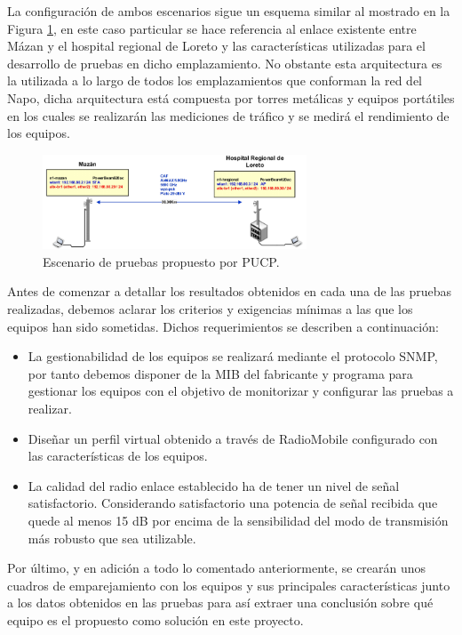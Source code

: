  La configuración de ambos escenarios sigue un esquema similar al mostrado en la Figura \ref{pruebasPUCP}, en este caso particular se hace referencia al enlace existente entre Mázan y el hospital regional de Loreto y las características utilizadas para el desarrollo de pruebas en dicho emplazamiento. No obstante esta arquitectura es la utilizada a lo largo de todos los emplazamientos que conforman la red del Napo, dicha arquitectura está compuesta por torres metálicas y equipos portátiles en los cuales se realizarán las mediciones de tráfico y se medirá el rendimiento de los equipos.
 
 \begin{figure}[H]
			\centering
			\includegraphics[width=0.7\textwidth]{img/enlace.PNG}
			\caption{Escenario de pruebas propuesto por PUCP.}
			\label{pruebasPUCP}
\end{figure}

Antes de comenzar a detallar los resultados obtenidos en cada una de las pruebas realizadas, debemos aclarar los criterios y exigencias mínimas a las que los equipos han sido sometidas. Dichos requerimientos se describen a continuación:

\begin{itemize}
    \item La gestionabilidad de los equipos se realizará mediante el protocolo SNMP, por tanto debemos disponer de la MIB del fabricante y programa para gestionar los equipos con el objetivo de monitorizar y configurar las pruebas a realizar.
    \item Diseñar un perfil virtual obtenido a través de RadioMobile configurado con las características de los equipos.
    \item La calidad del radio enlace establecido ha de tener un nivel de señal satisfactorio. Considerando satisfactorio una potencia de señal recibida que quede al menos 15 dB por encima de la sensibilidad del modo de transmisión más robusto que sea utilizable.
\end{itemize}

Por último, y en adición a todo lo comentado anteriormente, se crearán unos cuadros de emparejamiento con los equipos y sus principales características junto a los datos obtenidos en las pruebas para así extraer una conclusión sobre qué equipo es el propuesto como solución en este proyecto.

